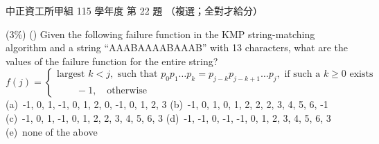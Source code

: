 \begin{pastexam}[label={px:ccu-115-swa-12}]{中正資工所甲組 115 學年度 第 22 題}
（複選；全對才給分）

(3\%) (\qquad) Given the following failure function in the KMP string-matching algorithm and a
string ``AAABAAAABAAAB'' with 13 characters, what are the values of the failure function for the
entire string?
\[
f(j)=\begin{cases}\text{largest } k<j,\text{ such that } p_0p_1\ldots p_k=p_{j-k}p_{j-k+1}\ldots p_j,
\text{ if such a } k\ge 0 \text{ exists}\\
\qquad -1,\quad \text{otherwise}\end{cases}
\]
(a)~-1, 0, 1, -1, 0, 1, 2, 0, -1, 0, 1, 2, 3 \qquad (b)~-1, 0, 1, 0, 1, 2, 2, 2, 3, 4, 5, 6, -1\\
(c)~-1, 0, 1, -1, 0, 1, 2, 2, 3, 4, 5, 6, 3 \qquad (d)~-1, -1, 0, -1, -1, 0, 1, 2, 3, 4, 5, 6, 3\\
(e)~none of the above
\end{pastexam}

